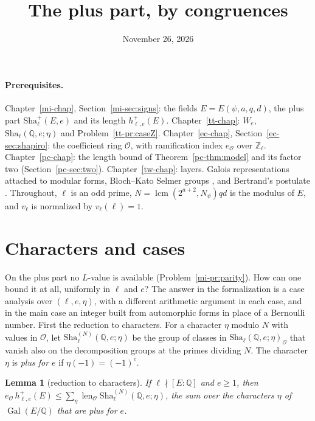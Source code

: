 \documentclass[reqno]{amsart}
\title{The plus part, by congruences}
\author{}
\date{November 26, 2026}
\newcounter{chap}
\theoremstyle{definition}
\theoremstyle{plain}
\newtheorem{lemma}[theorem]{Lemma}
\theoremstyle{remark}
\newcommand{\Z}{\mathbb{Z}}
\newcommand{\Q}{\mathbb{Q}}
\newcommand{\Zl}{\Z_\ell}
\newcommand{\Oc}{\mathcal{O}}
\newcommand{\Gal}{\operatorname{Gal}}
\newcommand{\len}{\operatorname{len}}
\newcommand{\Sha}{\mathrm{Sha}}
\begin{document}
\maketitle
{}\label{chap}

\paragraph{Prerequisites.}
Chapter~\ref{mi-chap}, Section~\ref{mi-sec:signs}: the fields \(E=E(\psi,a,q,d)\), the plus part \(\Sha^+_\ell(E,e)\) and its length \(h^+_{\ell,e}(E)\).  Chapter~\ref{tt-chap}: \(W_e\), \(\Sha_\ell(\Q,e;\eta)\) and Problem~\ref{tt-pr:caseZ}.  Chapter~\ref{ec-chap}, Section~\ref{ec-sec:shapiro}: the coefficient ring \(\Oc\), with ramification index \(e_\Oc\) over \(\Zl\).  Chapter~\ref{pc-chap}: the length bound of Theorem~\ref{pc-thm:model} and its factor two (Section~\ref{pc-sec:two}).  Chapter~\ref{tw-chap}: layers.  Galois representations attached to modular forms, Bloch--Kato Selmer groups \cite{BK}, and Bertrand's postulate \cite[Ch.~2]{AZ}.  Throughout, \(\ell\) is an odd prime, \(N=\operatorname{lcm}(2^{a+2},N_\psi)qd\) is the modulus of \(E\), and \(v_\ell\) is normalized by \(v_\ell(\ell)=1\).

\section{Characters and cases}\label{sec:cases}

On the plus part no \(L\)-value is available (Problem~\ref{mi-pr:parity}).  How can one bound it at all, uniformly in \(\ell\) and \(e\)?  The answer in the formalization is a case analysis over \((\ell,e,\eta)\), with a different arithmetic argument in each case, and in the main case an integer built from automorphic forms in place of a Bernoulli number.  First the reduction to characters.  For a character \(\eta\) modulo \(N\) with values in \(\Oc\), let \(\Sha^{(N)}_\ell(\Q,e;\eta)\) be the group of classes in \(\Sha_\ell(\Q,e;\eta)_\Oc\) that vanish also on the decomposition groups at the primes dividing \(N\).  The character \(\eta\) is \emph{plus for \(e\)} if \(\eta(-1)=(-1)^e\).

\begin{lemma}[reduction to characters]\label{lem:red}
If \(\ell\nmid[E:\Q]\) and \(e\ge1\), then \(e_\Oc\,h^+_{\ell,e}(E)\le\sum_\eta\len_\Oc\Sha^{(N)}_\ell(\Q,e;\eta)\), the sum over the characters \(\eta\) of \(\Gal(E/\Q)\) that are plus for \(e\).
\end{lemma}
\end{document}
